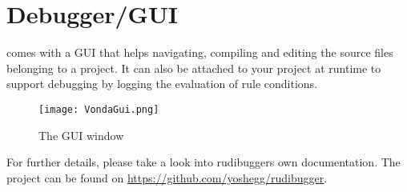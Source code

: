 \section{Debugger/GUI}
\label{sec:debugger}

\vonda comes with a GUI \citep{rudibuggerThesis} that helps navigating, compiling and editing the source files belonging to a project. It can also be attached to your \vonda project at runtime to support debugging by logging the evaluation of rule conditions.

\begin{figure}[thb]

  \centering
  \texttt{[image: VondaGui.png]}
  \caption{The \vonda GUI window}
  \label{vondagui}
\end{figure}

For further details, please take a look into rudibuggers own documentation. The project can be found on \url{https://github.com/yoshegg/rudibugger}.